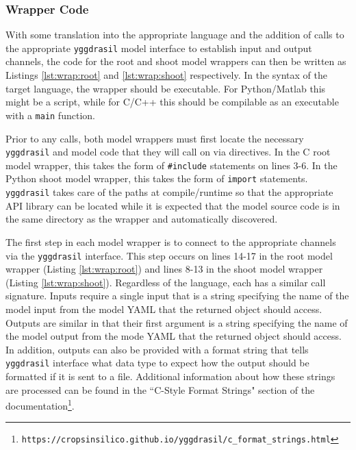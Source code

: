 \documentclass[journal]{IEEEtran}
\newcommand{\pkg}{{\tt yggdrasil}{}}
\newcommand{\pkglink}{yggdrasil}
\newcommand{\rootwrap}{}
\newcommand{\shootwrap}{}
\begin{document}
\subsubsection{Wrapper Code}
%
With some translation into the appropriate language and the addition of calls to the appropriate {\pkg} model interface to establish input and output channels, the code for the root and shoot model wrappers can then be written as Listings \ref{lst:wrap:root} and \ref{lst:wrap:shoot} respectively. In the syntax of the target language, the wrapper should be executable. For Python/Matlab this might be a script, while for C/C++ this should be compilable as an executable with a {\tt main} function.
%
\rootwrap
%
\shootwrap
%
Prior to any calls, both model wrappers must first locate the necessary {\pkg} and model code that they will call on via directives. In the C root model wrapper, this takes the form of {\tt \#include} statements on lines 3-6. In the Python shoot model wrapper, this takes the form of {\tt import} statements. {\pkg} takes care of the paths at compile/runtime so that the appropriate API library can be located while it is expected that the model source code is in the same directory as the wrapper and automatically discovered.

The first step in each model wrapper is to connect to the appropriate channels via the {\pkg} interface. This step occurs on lines 14-17 in the root model wrapper (Listing \ref{lst:wrap:root}) and lines 8-13 in the shoot model wrapper (Listing \ref{lst:wrap:shoot}). Regardless of the language, each has a similar call signature. Inputs require a single input that is a string specifying the name of the model input from the model YAML that the returned object should access. Outputs are similar in that their first argument is a string specifying the name of the model output from the mode YAML that the returned object should access. In addition, outputs can also be provided with a format string that tells {\pkg} interface what data type to expect how the output should be formatted if it is sent to a file. Additional information about how these strings are processed can be found in the ``C-Style Format Strings" section of the documentation\footnote{{\tt https://cropsinsilico.github.io/\pkglink/c\_format\_strings.html}}.
\end{document}
